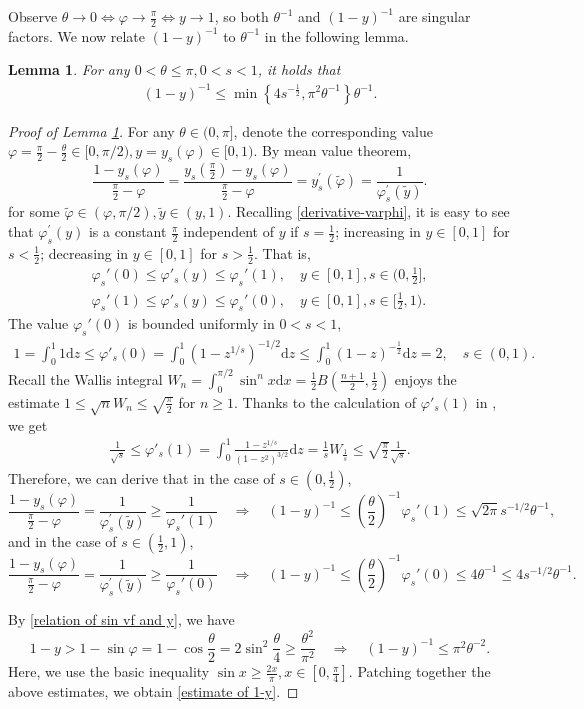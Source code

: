 \documentclass[reqno,10pt]{amsart}
\let\vf=\varphi
\def\th{\theta}
\newcommand{\ben}{\begin{eqnarray}}
\newcommand{\een}{\end{eqnarray}}
\newtheorem{lem}{Lemma}[section]
\theoremstyle{definition}
\numberwithin{equation}{section}
\begin{document}
 Observe $\th\to0\iff \vf\to\frac{\pi}{2}\iff y \to 1$, so both $\th^{-1}$ and $(1-y)^{-1}$ are singular factors. We now relate $(1-y)^{-1}$ to $\th^{-1}$ in the following lemma.
\begin{lem}\label{y-near-1-asy} For any  $0 < \theta \leq  \pi, 0<s<1$, it holds that
\ben\label{estimate of 1-y}
(1-y)^{-1} \leq \min\left\{4 s^{-\frac{1}{2}}, \pi^{2}\th^{-1}\right\} \theta^{-1}.
\een
\end{lem}
\begin{proof}[Proof of Lemma  \ref{y-near-1-asy}] For any 
    $\theta \in(0,\pi]$, denote the corresponding value $\varphi = \frac{\pi}{2}-\frac{\theta}{2} \in [0, \pi/2), y=y_s(\varphi) \in [0,1)$.
By mean value theorem,
$$\frac{1-y_s(\varphi)}{\frac{\pi}{2}-\varphi}=\frac{y_s\left(\frac{\pi}{2}\right)-y_s(\varphi)}{\frac{\pi}{2}-\varphi}=y_s^{\prime}(\tilde{\varphi})=\frac{1}{\varphi_s^{\prime}(\tilde{y})}.$$
for some $\tilde{\varphi} \in (\varphi,\pi/2), \tilde{y} \in (y,1)$. Recalling \eqref{derivative-varphi},
 it is easy to see that $\varphi_{s}^{\prime}(y)$ is a constant $\frac{\pi}{2}$ independent of $y$ if $s=\frac{1}{2}$;
 increasing in $y\in[0,1]$ for $s<\frac{1}{2}$; decreasing in $y\in[0,1]$ for $s>\frac{1}{2}$. That is,
\ben \label{s-small-derivetive-varphi}
    \vf_s'(0)\le \vf'_s(y)\le \vf_s'(1),\quad  y\in[0,1],s\in (0,\frac{1}{2}],\\
    \label{s-large-derivetive-varphi}
    \vf_s'(1)\le \vf'_s(y)\le \vf_s'(0), \quad  y\in[0,1],s\in[\frac{1}{2},1).
\een 
The value $\vf_s'(0)$ is bounded uniformly in $0<s<1$,
\ben \label{vf-s-prime-0}
1=\int_{0}^{1}1\mathrm{d}z\le\vf'_s(0)=\int_{0}^{1}(1-z^{1/s})^{-1/2}\mathrm{d}z\le\int_{0}^{1}(1-z)^{-\frac{1}{2}}\mathrm{d}z=2,\quad  s\in(0,1).
\een
Recall the Wallis integral $W_n=\int_{0}^{\pi/2}\sin^{n}x\mathrm{d}x=\frac{1}{2}B(\frac{n+1}{2},\frac{1}{2})$ enjoys the estimate  $1 \leq \sqrt{n} W_n \leq \sqrt{\frac{\pi}{2}}$ for $n \geq 1$.
Thanks to the calculation of $\vf'_s(1)$ in 
\cite{Jang2023-df}, we get
\ben \label{vf-s-prime-1}
\frac{1}{\sqrt{s}} \leq \vf'_s(1)=\int_{0}^{1}\frac{1-z^{1/s}}{(1-z^2)^{3/2}}\mathrm{d}z=\frac{1}{s}W_{\frac{1}{s}} \leq  \sqrt{\frac{\pi}{2}} \frac{1}{\sqrt{s}}.
\een
Therefore, we can derive that in the case of $s\in(0,\frac{1}{2})$,
$$\frac{1-y_s(\varphi)}{\frac{\pi}{2}-\varphi}=\frac{1}{\varphi_s^{\prime}(\tilde{y})}\ge\frac{1}{\vf_s'(1)}
\quad \Longrightarrow \quad
 (1-y)^{-1}\le (\frac{\th}{2})^{-1}\vf_s'(1)\le \sqrt{2\pi} s^{-1/2}\th^{-1},$$
and in the case of $s\in(\frac{1}{2},1)$,
$$
\frac{1-y_s(\varphi)}{\frac{\pi}{2}-\varphi}=\frac{1}{\varphi_s^{\prime}(\tilde{y})}\ge\frac{1}{\vf_s'(0)} \quad \Longrightarrow \quad
(1-y)^{-1}\le (\frac{\th}{2})^{-1}\vf_s'(0)\le4\th^{-1}\le 4 s^{-1/2}\th^{-1}.
$$

By \eqref{relation of sin vf and y}, we have 
$$
1-y>1-\sin \vf=1-\cos \frac{\th}{2} = 2\sin^2\frac{\th}{4} \geq \frac{\th^2}{\pi^2} \quad \Longrightarrow \quad  (1-y)^{-1}\le  \pi^2 \th^{-2}.
$$
Here, we use the basic inequality $\sin x\ge \frac{2x}{\pi},x\in[0,\frac{\pi}{4}]$. Patching together the above estimates, we obtain \eqref{estimate of 1-y}.
\end{proof}
\end{document}
